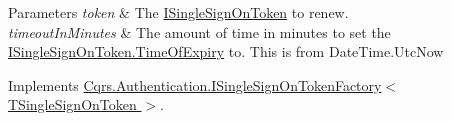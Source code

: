 \begin{DoxyParams}{Parameters}
{\em token} & The \hyperlink{interfaceCqrs_1_1Authentication_1_1ISingleSignOnToken}{I\+Single\+Sign\+On\+Token} to renew.\\
\hline
{\em timeout\+In\+Minutes} & The amount of time in minutes to set the \hyperlink{interfaceCqrs_1_1Authentication_1_1ISingleSignOnToken_a50af484569cc78f88acb01f1938a7cd8_a50af484569cc78f88acb01f1938a7cd8}{I\+Single\+Sign\+On\+Token.\+Time\+Of\+Expiry} to. This is from Date\+Time.\+Utc\+Now\\
\hline
\end{DoxyParams}


Implements \hyperlink{interfaceCqrs_1_1Authentication_1_1ISingleSignOnTokenFactory_ab436004ad1631140f7a58927cbacd8c4_ab436004ad1631140f7a58927cbacd8c4}{Cqrs.\+Authentication.\+I\+Single\+Sign\+On\+Token\+Factory$<$ T\+Single\+Sign\+On\+Token $>$}.

